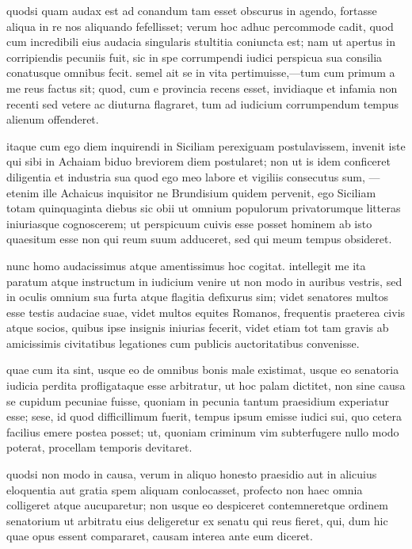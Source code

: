  quodsi quam audax est ad conandum tam esset obscurus in agendo, fortasse aliqua in re nos aliquando fefellisset; verum hoc adhuc percommode cadit, quod cum incredibili eius audacia singularis stultitia coniuncta est; nam ut apertus in corripiendis pecuniis fuit, sic in spe corrumpendi iudici perspicua sua consilia conatusque omnibus fecit. semel ait se in vita pertimuisse,—tum cum primum a me reus factus sit; quod, cum e provincia recens esset, invidiaque et infamia non recenti sed vetere ac diuturna flagraret, tum ad iudicium corrumpendum tempus alienum offenderet.

 itaque cum ego diem inquirendi in Siciliam perexiguam postulavissem, invenit iste qui sibi in Achaiam biduo breviorem diem postularet; non ut is idem conficeret diligentia et industria sua quod ego meo labore et vigiliis consecutus sum, —etenim ille Achaicus inquisitor ne Brundisium quidem pervenit, ego Siciliam totam quinquaginta diebus sic obii ut omnium populorum privatorumque litteras iniuriasque cognoscerem; ut perspicuum cuivis esse posset hominem ab isto quaesitum esse non qui reum suum adduceret, sed qui meum tempus obsideret.

 nunc homo audacissimus atque amentissimus hoc cogitat. intellegit me ita paratum atque instructum in iudicium venire ut non modo in auribus vestris, sed in oculis omnium sua furta atque flagitia defixurus sim; videt senatores multos esse testis audaciae suae, videt multos equites Romanos, frequentis praeterea civis atque socios, quibus ipse insignis iniurias fecerit, videt etiam tot tam gravis ab amicissimis civitatibus legationes cum publicis auctoritatibus convenisse.

 quae cum ita sint, usque eo de omnibus bonis male existimat, usque eo senatoria iudicia perdita profligataque esse arbitratur, ut hoc palam dictitet, non sine causa se cupidum pecuniae fuisse, quoniam in pecunia tantum praesidium experiatur esse; sese, id quod difficillimum fuerit, tempus ipsum emisse iudici sui, quo cetera facilius emere postea posset; ut, quoniam criminum vim subterfugere nullo modo poterat, procellam temporis devitaret.

 quodsi non modo in causa, verum in aliquo honesto praesidio aut in alicuius eloquentia aut gratia spem aliquam conlocasset, profecto non haec omnia colligeret atque aucuparetur; non usque eo despiceret contemneretque ordinem senatorium ut arbitratu eius deligeretur ex senatu qui reus fieret, qui, dum hic quae opus essent compararet, causam interea ante eum diceret.

